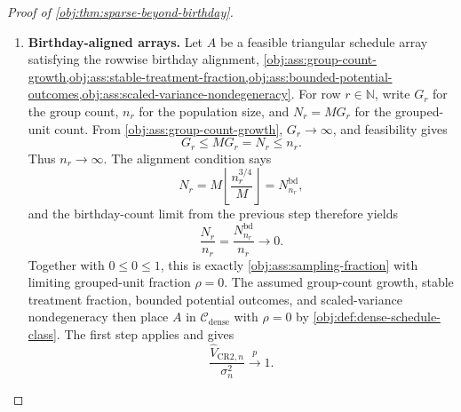 \documentclass[11pt]{article}
\begin{document}
\begin{proof}[Proof of \cref{obj:thm:sparse-beyond-birthday}]
\begin{enumerate}
\item \textbf{Birthday-aligned arrays.}
Let \(A\) be a feasible triangular schedule array satisfying the rowwise birthday alignment, \cref{obj:ass:group-count-growth,obj:ass:stable-treatment-fraction,obj:ass:bounded-potential-outcomes,obj:ass:scaled-variance-nondegeneracy}. For row \(r\in\mathbb N\), write \(G_r\) for the group count, \(n_r\) for the population size, and \(N_r=MG_r\) for the grouped-unit count. From \cref{obj:ass:group-count-growth}, \(G_r\to\infty\), and feasibility gives
\[
G_r\le M G_r=N_r\le n_r .
\]
Thus \(n_r\to\infty\). The alignment condition says
\[
N_r
=
M\left\lfloor \frac{n_r^{3/4}}{M}\right\rfloor
=
N_{n_r}^{\mathrm{bd}},
\]
and the birthday-count limit from the previous step therefore yields
\[
\frac{N_r}{n_r}
=
\frac{N_{n_r}^{\mathrm{bd}}}{n_r}
\to 0 .
\]
Together with \(0\le 0\le 1\), this is exactly \cref{obj:ass:sampling-fraction} with limiting grouped-unit fraction \(\rho=0\). The assumed group-count growth, stable treatment fraction, bounded potential outcomes, and scaled-variance nondegeneracy then place \(A\) in \(\mathcal C_{\mathrm{dense}}\) with \(\rho=0\) by \cref{obj:def:dense-schedule-class}. The first step applies and gives
\[
\frac{\widehat V_{\mathrm{CR2},n}}{\sigma_n^2}
\xrightarrow{p}1 .
\]
\end{enumerate}
\end{proof}
\end{document}
